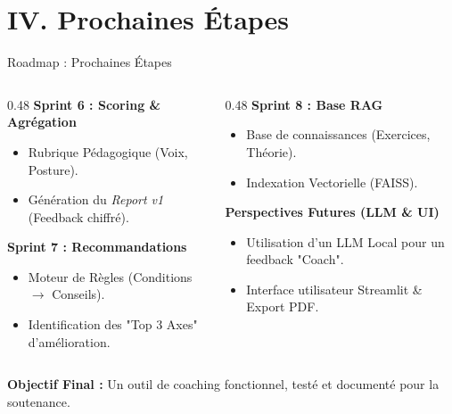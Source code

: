 \documentclass[10pt,aspectratio=169]{beamer}
\begin{document}
\section{IV. Prochaines Étapes}

\begin{frame}{Roadmap : Prochaines Étapes}
    \begin{columns}[T]
        \begin{column}{0.48\textwidth}
            \textbf{\textcolor{primary}{Sprint 6 : Scoring \& Agrégation}}
            \begin{itemize} \footnotesize
                \item Rubrique Pédagogique (Voix, Posture).
                \item Génération du \textit{Report v1} (Feedback chiffré).
            \end{itemize}
            \vspace{0.3cm}
            \textbf{\textcolor{primary}{Sprint 7 : Recommandations}}
            \begin{itemize} \footnotesize
                \item Moteur de Règles (Conditions $\rightarrow$ Conseils).
                \item Identification des "Top 3 Axes" d'amélioration.
            \end{itemize}
        \end{column}
        \begin{column}{0.48\textwidth}
            \textbf{\textcolor{accent}{Sprint 8 : Base RAG}}
            \begin{itemize} \footnotesize
                \item Base de connaissances (Exercices, Théorie).
                \item Indexation Vectorielle (FAISS).
            \end{itemize}
            \vspace{0.3cm}
            \textbf{\textcolor{success}{Perspectives Futures (LLM \& UI)}}
            \begin{itemize} \footnotesize
                \item Utilisation d'un LLM Local pour un feedback "Coach".
                \item Interface utilisateur Streamlit \& Export PDF.
            \end{itemize}
        \end{column}
    \end{columns}
    \vspace{0.5cm}
    \begin{tcolorbox}[colback=primary!5, colframe=primary]
        \centering \small
        \textbf{Objectif Final :} Un outil de coaching fonctionnel, testé et documenté pour la soutenance.
    \end{tcolorbox}
\end{frame}
\end{document}
